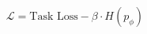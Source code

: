 \documentclass[preview]{standalone}
\begin{document}
\begin{align*}
\mathcal{L} = \text{Task Loss} -  \beta  \cdot H(p_\phi)
\end{align*}
\end{document}
